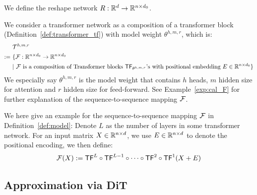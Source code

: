 \begin{definition}\label{def:R}
    We define the reshape network $R: \mathbb{R}^d \rightarrow \mathbb{R}^{n \times d_0}$.
\end{definition}

\begin{definition}\label{def:model}
    We consider a transformer network as a composition of a transformer block (Definition~\ref{def:transformer_tf}) with model weight $\theta^{h, m, r}$, which is:
    \begin{align*}
        & ~ {\cal T}^{h, m, r} \\
        := & ~ \{ {\cal F}: \mathbb{R}^{n \times d_0} \rightarrow \mathbb{R}^{n \times d_0}~\\
        & ~ |~\text{${\cal F}$ is a composition of Transformer blocks ${\sf TF}_{\theta^{h, m, r}}$’s with positional embedding $E \in \mathbb{R}^{n \times d_0}$}\}
    \end{align*}
    We especially say $\theta^{h, m, r}$ is the model weight that contains $h$ heads, $m$ hidden size for attention and $r$ hidden size for feed-forward. See Example~\ref{exp:cal_F} for further explanation of the sequence-to-sequence mapping ${\cal F}$.
\end{definition}

\begin{example}\label{exp:cal_F}
    We here give an example for the sequence-to-sequence mapping ${\cal F}$ in Definition~\ref{def:model}: Denote $L$ as the number of layers in some transformer network. For an input matrix $X \in \mathbb{R}^{n \times d}$, we use $E \in \mathbb{R}^{n \times d}$ to denote the positional encoding, we then define:
    \begin{align*}
        {\cal F}(X) := {\sf TF}^L \circ {\sf TF}^{L-1} \circ \cdots \circ {\sf TF}^2 \circ {\sf TF}^1(X + E)
    \end{align*}
\end{example}

\subsection{Approximation via DiT} \label{sub:app:approx_dit}

